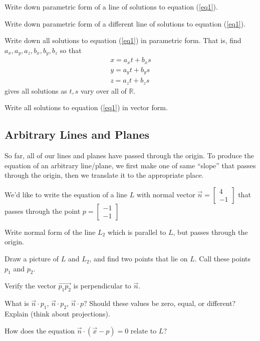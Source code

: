 \documentclass[letter]{article}
\newcommand{\R}{\mathbb{R}}
\newcommand{\mat}[1]{\begin{bmatrix}#1\end{bmatrix}}
\begin{document}
	\begin{Enum}[resume]
		\item Write down parametric form of a line of solutions to equation (\ref{eq1}).
		\item Write down parametric form of a different line of solutions to equation (\ref{eq1}).
		\item Write down all solutions to equation (\ref{eq1}) in parametric form.  That is, find $a_x,
		a_y,a_z,b_x,b_y,b_z$ so that
		\[
			\begin{array}{l}
				x=a_x t+b_x s\\
				y=a_y t+b_y s\\
				z=a_z t+b_z s
			\end{array}
		\]
		gives all solutions as $t,s$ vary over all of $\R$.
		\item Write all solutions to equation (\ref{eq1}) in vector form.
	\end{Enum}

\subsection*{Arbitrary Lines and Planes}
	
	So far, all of our lines and planes have passed through the origin. To 
	produce the equation of an arbitrary line/plane, we first make one of
	same ``slope'' that passes through the origin, then we translate it
	to the appropriate place.

	We'd like to write the equation of a line $L$ with normal vector
	$\vec n=\begin{bmatrix}4\\-1\end{bmatrix}$ that passes through
	the point $p=\mat{-1\\-1}$

	\begin{Enum}
		\item Write normal form of the line $L_2$ which is parallel to $L$,
		but passes through the origin.
		\item Draw a picture of $L$ and $L_2$, and find two points that lie on
		$L$.  Call these points $p_1$ and $p_2$.
		\item Verify the vector $\vec {p_1p_2}$ is perpendicular to $\vec n$.
		\item What is $\vec n\cdot p_1$, $\vec n\cdot p_2$, $\vec n\cdot p$?
		Should these values be zero, equal, or different?  Explain (think about
		projections).
		\item How does the equation $\vec n\cdot (\vec x-p)=0$ relate to $L$?
	\end{Enum}
\end{document}
